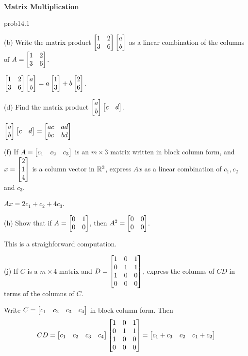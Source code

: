 

 \centerline{\bf  {Matrix Multiplication}} 


\begin{sol}{prob14.1}


(b) Write the matrix product $\bmatrix 1&
2\\ 3&6\endbmatrix \bmatrix a\\ b\endbmatrix$ as a linear combination of the columns of $A=\bmatrix 1&
2\\ 3&6\endbmatrix$.

\soln $\bmatrix 1&
2\\ 3&6\endbmatrix \bmatrix a\\ b\endbmatrix = a \bmatrix 1\\ 3\endbmatrix + b \bmatrix 2\\ 6\endbmatrix $.

\medskip


(d) Find the matrix product $\bmatrix a \\ b \endbmatrix \bmatrix c&d \endbmatrix$.

\soln $\bmatrix a \\ b \endbmatrix \bmatrix c&d \endbmatrix= \bmatrix ac&ad\\ bc&bd\endbmatrix$
\medskip 
%


(f) If $A=\bmatrix c_1&c_2 &c_3\endbmatrix$ is an $m\times 3$ matrix written in block column form, and $x=\bmatrix 2\\1\\ 4\endbmatrix$ is a column vector in $\mathbb{R}^3$, express $Ax$ as a linear combination of $c_1, c_2$ and $c_3$.

\soln  
$Ax =2c_1 + c_2 + 4c_3$.

\medskip 
%

(h) Show that if $A=
\bmatrix 0&1\\ 0&0\endbmatrix$, then $A^2=\bmatrix0&0\cr 0&0\endbmatrix$. 

\soln This is a straighforward computation.
\medskip 
 

(j) If $C$ is a $m\times 4$ matrix and $D  =\bmatrix 1&0&1\\0&1&1\\ 1&0&0\\0&0&0 \endbmatrix $, express the columns of $CD$ in terms of the columns of $C$.

\soln Write $C=\bmatrix c_1&c_2 &c_3& c_4\endbmatrix$ in block column form. Then $$CD=\bmatrix c_1&c_2 &c_3& c_4\endbmatrix \bmatrix 1&0&1\\0&1&1\\ 1&0&0\\0&0&0 \endbmatrix=\bmatrix c_1+c_3&c_2 &c_1+c_2\endbmatrix $$
\medskip
%


\end{sol}
